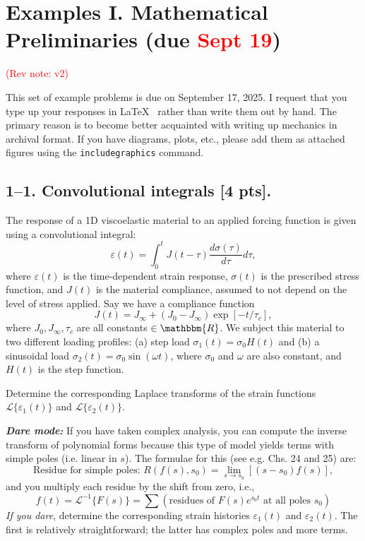 
\section*{Examples I. Mathematical Preliminaries (due \textcolor{red}{Sept 19})}
\textcolor{red}{(Rev note: v2)}
\label{PS1}

This set of example problems is due on September 17, 2025. 
I request that you type up your responses in \LaTeX~ rather than write them out by hand. 
The primary reason is to become better acquainted with writing up mechanics in archival format. 
If you have diagrams, plots, etc., please add them as attached figures using the \texttt{includegraphics} command. 

\bigskip
\subsection*{1--1. \textbf{Convolutional integrals} [4 pts].} The response of a 1D viscoelastic material to an applied forcing function is given using a convolutional integral:
\begin{equation}
    \varepsilon(t) = \int_0^t J(t-\tau) \frac{d\sigma(\tau)}{d\tau} d\tau,
\end{equation}
where $\varepsilon(t)$ is the time-dependent strain response, $\sigma(t)$ is the prescribed stress function, and $J(t)$ is the material compliance, assumed to not depend on the level of stress applied. 
Say we have a compliance function 
\begin{equation}
    J(t) = J_\infty + (J_0-J_\infty)\exp[-t/\tau_c],
\end{equation}
where $J_0, J_\infty, \tau_c$ are all constants $\in \mathbbm{R}$. 
We subject this material to two different loading profiles: (a) step load $\sigma_1(t) = \sigma_0 H(t)$ and (b) a sinusoidal load $\sigma_2(t) = \sigma_0  \sin(\omega t)$, where $\sigma_0$ and $\omega$ are also constant, and $H(t)$ is the step function. 

Determine the corresponding Laplace transforms of the strain functions $\mathcal{L}\{\varepsilon_1(t)\}$ and $\mathcal{L}\{\varepsilon_2(t)\}$. 

\textit{\textbf{Dare mode:}} If you have taken complex analysis, you can compute the inverse transform of polynomial forms because this type of model yields terms with simple poles (i.e. linear in $s$). 
The formulae for this (see e.g. \cite{rileyMathematicalMethodsPhysics2006} Chs. 24 and 25) are:
\begin{equation*}
    \textrm{Residue for simple poles: } R(f(s),s_0) = \lim\limits_{s\rightarrow s_0} \left[ (s-s_0) f(s) \right],
\end{equation*}
and you multiply each residue by the shift from zero, i.e.,
\begin{equation*}
    f(t) = \mathcal{L}^{-1}\{F(s)\} = \sum \left( \textrm{residues of } F(s)e^{s_0 t} \textrm{ at all poles } s_0 \right)
\end{equation*}
\textit{If you dare}, determine the corresponding strain histories $\varepsilon_1(t)$ and $\varepsilon_2(t)$. The first is relatively straightforward; the latter has complex poles and more terms. 


